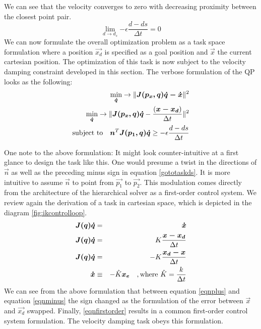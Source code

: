 We can see that the velocity converges to zero with decreasing proximity between the closest point pair.
\begin{equation}
\lim\limits_{d \rightarrow d_s}{- \epsilon\frac{d - ds}{\Delta t} = 0}
\end{equation}
\newpage
We can now formulate the overall optimization problem as a task space formulation where a position $\vec{x_d}$ is specified as a goal position and $\vec{x}$ the current cartesian position. The optimization of this task is now subject to the velocity damping constraint developed in this section. The verbose formulation of the QP looks as the following:
\begin{eqnarray}
\underset{\vec{\dot{q}}}{\text{min}} \rightarrow \Vert \vec{J(p_x,q) \dot{q} - \dot{x}} \Vert^2  \notag \\
\underset{\vec{\dot{q}}}{\text{min}} \rightarrow \Vert \vec{J(p_x,q) \dot{q}} - \frac{(\vec{x-x_d})}{\Delta t} \Vert^2  \\
\text{subject to} \quad \vec{n}^T\vec{J(p_1,q)} \vec{\dot{q}} \geq - \epsilon \frac{d - ds}{\Delta t} \label{eqn:taskdampconstraint}
\end{eqnarray}

One note to the above formulation: It might look counter-intuitive at a first glance to design the task like this. One would presume a twist in the directions of $\vec{n}$ as well as the preceding minus sign in equation \ref{gototaskds}. It is more intuitive to assume $\vec{n}$ to point from $\vec{p_1}$ to $\vec{p_2}$. This modulation comes directly from the architecture of the hierarchical solver as a first-order control system. We review again the derivation of a task in cartesian space, which is depicted in the diagram \ref{fig:ikcontrolloop}.
\begin{eqnarray}
\vec{J(q)\dot{q}} &=& \vec{\dot{x}} \notag \\
\vec{J(q)\dot{q}} &=& K \frac{\vec{x - x_d}}{\Delta t} \label{eqnplus}  \\
\vec{J(q)\dot{q}} &=& -K \frac{\vec{x_d - x}}{\Delta t} \label{eqnminus}  \\
\vec{\dot{x}} &\equiv& - \hat{K} \vec{x_e} \quad, \text{where } \hat{K}= \frac{k}{\Delta t} \label{eqnfirstorder}
\end{eqnarray}
We can see from the above formulation that between equation \ref{eqnplus} and equation \ref{eqnminus} the sign changed as the formulation of the error between $\vec{x}$ and $\vec{x_d}$ swapped. Finally, \ref{eqnfirstorder} results in a common first-order control system formulation. The velocity damping task obeys this formulation.

